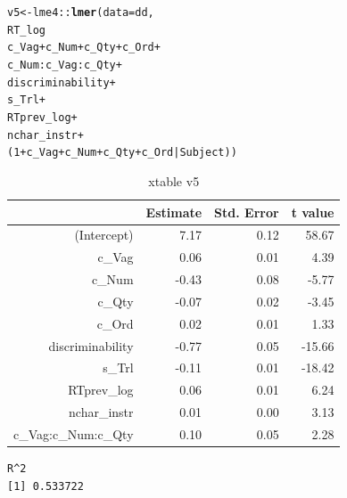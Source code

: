 \documentclass[a4paper,12pt]{article}\usepackage[]{graphicx}\usepackage[]{color}
\makeatletter
\newcommand{\hlnum}[1]{\textcolor[rgb]{0.686,0.059,0.569}{#1}}%
\newcommand{\hlopt}[1]{\textcolor[rgb]{0,0,0}{#1}}%
\newcommand{\hlstd}[1]{\textcolor[rgb]{0.345,0.345,0.345}{#1}}%
\newcommand{\hlkwb}[1]{\textcolor[rgb]{0.69,0.353,0.396}{#1}}%
\newcommand{\hlkwc}[1]{\textcolor[rgb]{0.333,0.667,0.333}{#1}}%
\newcommand{\hlkwd}[1]{\textcolor[rgb]{0.737,0.353,0.396}{\textbf{#1}}}%
\newenvironment{kframe}{%
 \def\at@end@of@kframe{}%
 \ifinner\ifhmode%
  \def\at@end@of@kframe{\end{minipage}}%
  \begin{minipage}{\columnwidth}%
 \fi\fi%
 \def\FrameCommand##1{\hskip\@totalleftmargin \hskip-\fboxsep
 \colorbox{shadecolor}{##1}\hskip-\fboxsep
     \hskip-\linewidth \hskip-\@totalleftmargin \hskip\columnwidth}%
 \MakeFramed {\advance\hsize-\width
   \@totalleftmargin\z@ \linewidth\hsize
   \@setminipage}}%
 {\par\unskip\endMakeFramed%
 \at@end@of@kframe}
\newenvironment{knitrout}{}{} %
\makeatother
\begin{document}
\begin{knitrout}\scriptsize
{}\color{fgcolor}\begin{kframe}
\begin{alltt}
\hlstd{v5} \hlkwb{<-} \hlstd{lme4}\hlopt{::}\hlkwd{lmer}\hlstd{(}\hlkwc{data}\hlstd{=dd,}
                 \hlstd{RT_log} \hlopt{~}
                   \hlstd{c_Vag} \hlopt{+} \hlstd{c_Num} \hlopt{+} \hlstd{c_Qty} \hlopt{+} \hlstd{c_Ord} \hlopt{+}
                   \hlstd{c_Num}\hlopt{:}\hlstd{c_Vag}\hlopt{:}\hlstd{c_Qty} \hlopt{+}
                   \hlstd{discriminability} \hlopt{+}
                   \hlstd{s_Trl} \hlopt{+}
                   \hlstd{RTprev_log} \hlopt{+}
                   \hlstd{nchar_instr} \hlopt{+}
                   \hlstd{(}\hlnum{1}\hlopt{+}\hlstd{c_Vag} \hlopt{+} \hlstd{c_Num} \hlopt{+} \hlstd{c_Qty} \hlopt{+} \hlstd{c_Ord}\hlopt{|}\hlstd{Subject))}
\end{alltt}
\end{kframe}
\end{knitrout}

\begin{table}[htbp]
\begingroup\small
\begin{tabular}{rrrr}
  \hline
 & Estimate & Std. Error & t value \\ 
  \hline
(Intercept) & 7.17 & 0.12 & 58.67 \\ 
  c\_Vag & 0.06 & 0.01 & 4.39 \\ 
  c\_Num & -0.43 & 0.08 & -5.77 \\ 
  c\_Qty & -0.07 & 0.02 & -3.45 \\ 
  c\_Ord & 0.02 & 0.01 & 1.33 \\ 
  discriminability & -0.77 & 0.05 & -15.66 \\ 
  s\_Trl & -0.11 & 0.01 & -18.42 \\ 
  RTprev\_log & 0.06 & 0.01 & 6.24 \\ 
  nchar\_instr & 0.01 & 0.00 & 3.13 \\ 
  c\_Vag:c\_Num:c\_Qty & 0.10 & 0.05 & 2.28 \\ 
   \hline
\end{tabular}
\endgroup
\caption{xtable v5} 
\end{table}


\begin{knitrout}\scriptsize
{}\color{fgcolor}\begin{kframe}
\begin{verbatim}
R^2
[1] 0.533722
\end{verbatim}
\end{kframe}
\end{knitrout}
\end{document}

